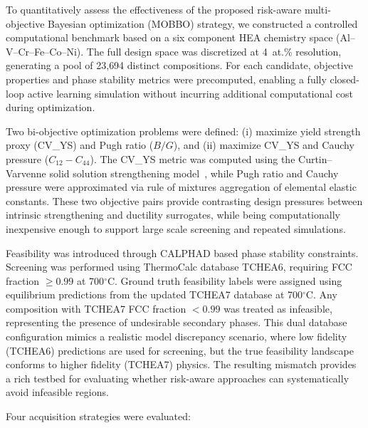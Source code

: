 \documentclass[letterpaper,4pt,times,preprint]{elsarticle}
\begin{document}
To quantitatively assess the effectiveness of the proposed risk-aware multi-objective Bayesian optimization (MOBBO) strategy, we constructed a controlled computational benchmark based on a six component HEA chemistry space (Al–V–Cr–Fe–Co–Ni). The full design space was discretized at 4~at.\% resolution, generating a pool of 23{,}694 distinct compositions. For each candidate, objective properties and phase stability metrics were precomputed, enabling a fully closed-loop active learning simulation without incurring additional computational cost during optimization.

Two bi-objective optimization problems were defined:  
(i) maximize yield strength proxy (CV\_YS) and Pugh ratio ($B/G$), and  
(ii) maximize CV\_YS and Cauchy pressure ($C_{12} - C_{44}$).  
The CV\_YS metric was computed using the Curtin–Varvenne solid solution strengthening model~\cite{varvenne2016theory}, while Pugh ratio and Cauchy pressure were approximated via rule of mixtures aggregation of elemental elastic constants. These two objective pairs provide contrasting design pressures between intrinsic strengthening and ductility surrogates, while being computationally inexpensive enough to support large scale screening and repeated simulations.

Feasibility was introduced through CALPHAD based phase stability constraints. Screening was performed using ThermoCalc database TCHEA6, requiring FCC fraction $\geq 0.99$ at 700$^\circ$C. Ground truth feasibility labels were assigned using equilibrium predictions from the updated TCHEA7 database at 700$^\circ$C. Any composition with TCHEA7 FCC fraction $<0.99$ was treated as infeasible, representing the presence of undesirable secondary phases. This dual database configuration mimics a realistic model discrepancy scenario, where low fidelity (TCHEA6) predictions are used for screening, but the true feasibility landscape conforms to higher fidelity (TCHEA7) physics. The resulting mismatch provides a rich testbed for evaluating whether risk-aware approaches can systematically avoid infeasible regions.

Four acquisition strategies were evaluated:
\end{document}
